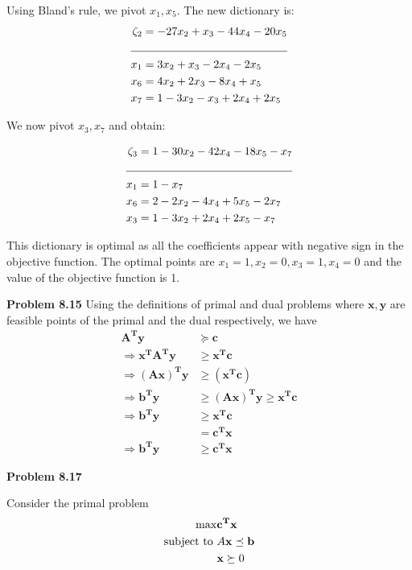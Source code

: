 \documentclass[letterpaper,12pt]{article}
\theoremstyle{definition}
\begin{document}
Using Bland's rule, we pivot $x_1, x_5$. The new dictionary is:
\begin{align*}
  \zeta_2 &= -27x_2+x_3-44x_4 - 20x_5\\
  \cline{1-2}
  x_1 &= 3x_2 + x_3 -2x_4-2x_5\\
  x_6 &= 4x_2+2x_3-8x_4+x_5\\
  x_7 &= 1-3x_2-x_3+2x_4+2x_5\\
\end{align*}

We now pivot $x_3, x_7$ and obtain:

\begin{align*}
  \zeta_3 &= 1-30x_2-42x_4-18x_5-x_7\\
  \cline{1-2}
  x_1 &= 1-x_7 \\
  x_6 &= 2-2x_2-4x_4+5x_5-2x_7 \\
  x_3 &= 1-3x_2+2x_4+2x_5-x_7 \\
\end{align*}

This dictionary is optimal as all the coefficients appear with negative sign in the objective function. The
optimal points are $x_1=1, x_2=0, x_3=1, x_4=0$ and the value of the objective function is 1.

\vspace{3mm}
\noindent\textbf{Problem 8.15}
  Using the definitions of primal and dual problems where $\bm{x, y}$ are feasible points of the primal
  and the dual respectively, we have
\begin{align*}
   \bm{A^Ty} &\succeq \bm{c} \\
   \Rightarrow \bm{x^TA^Ty} &\ge \bm {x^Tc}\\
   \Rightarrow \bm{(Ax)^Ty} &\ge \bm{(x^Tc)}\\
   \Rightarrow \bm{b^Ty} &\ge \bm{(Ax)^Ty} \ge \bm{x^Tc}\\
   \Rightarrow \bm{b^Ty} &\ge \bm{x^Tc}\\
   &=\bm{c^Tx}\\
   \Rightarrow \bm{b^Ty} &\ge \bm{c^Tx}
\end{align*}


\vspace{3mm}
\noindent\textbf{Problem 8.17}

Consider the primal problem
\begin{align*}
\max &\mathbf{c^Tx} \\
\textnormal{subject to } &A\textbf{x}\preceq \textbf{b}\\
&\textbf{x} \succeq 0\\
\end{align*}
\end{document}
